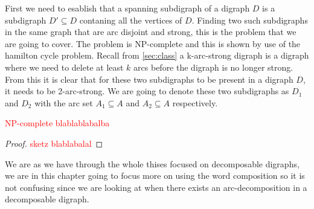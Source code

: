 First we need to esablish that a spanning subdigraph of a digraph $D$ is a subdigraph $D'\subseteq D$ contaning all the vertices of $D$.
Finding two such subdigraphs in the same graph that are arc disjoint and strong, this is the problem that we are going to cover.
The problem is NP-complete and this is shown by use of the hamilton cycle problem.
Recall from \autoref{sec:class} a k-arc-strong digraph is a digraph where we need to delete at least $k$ arcs before the digraph is no longer strong. 
From this it is clear that for these two subdigraphs to be present in a digraph $D$, it needs to be 2-arc-strong.
We are going to denote these two subdigraphs as $D_1$ and $D_2$ with the arc set $A_1\subseteq A$ and $A_2\subseteq A$ respectively.
\begin{thm}
    \textcolor{red}{NP-complete blablablabalba}
\end{thm}
\begin{proof}
    \textcolor{red}{sketz blablabalal}
\end{proof}
We are as we have through the whole thises focused on decomposable digraphs, we are in this chapter going to focus more on using the word composition so it is not confusing since we are looking at when there exists an arc-decomposition in a decomposable digraph.
